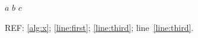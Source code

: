 \documentclass{article}
\begin{document}
\begin{algorithm}\caption{X}\label{alg:x}
\begin{algorithmic}[1]
\State $a$ \label{line:first}
\State $b$
\State $c$ \label{line:third}
\end{algorithmic}
\end{algorithm}
REF: \cref{alg:x}; \cref{line:first}; \cref{line:third}; line~\ref{line:third}.
\end{document}
